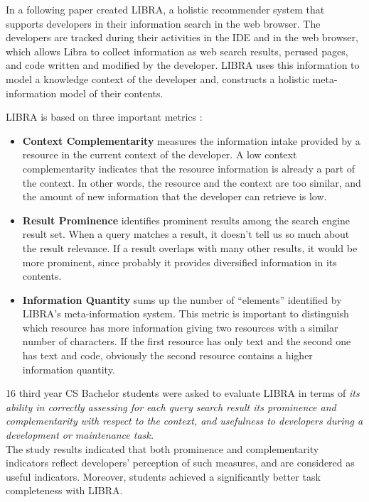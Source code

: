 \documentclass[12pt,mscthesis]{usiinfthesis}
\begin{document}
	
	In a following paper \citet{Ponz2017a} created LIBRA, a holistic recommender system that supports developers in their information search in the web browser. The developers are tracked during their activities in the IDE and in the web browser, which allows Libra to collect information as web search results, perused pages, and code written and modified by the developer. LIBRA uses this information to model a knowledge context of the developer and, constructs a holistic meta-information model of their contents.
	

	LIBRA is based on three important metrics :
	
	\begin{itemize}
	\item \textbf{Context Complementarity} measures the information intake provided by a resource in the current context of the developer. A low context complementarity indicates that the resource information is already a part of the context. In other words, the resource and the context are too similar, and the amount of new information that the developer can retrieve is low.
	
	\item \textbf{Result Prominence} identifies prominent results among the search engine result set. When a query matches a result, it doesn't tell us so much about the result relevance. If a result overlaps with many other results, it would be more prominent, since probably it provides diversified information in its contents.
	
	\item \textbf{Information Quantity} sums up the number of ``elements'' identified by LIBRA's meta-information system. This metric is important to distinguish which resource has more information giving two resources with a similar number of characters. If the first resource has only text and the second one has text and code, obviously the second resource contains a higher information quantity.
	\end{itemize}
	16 third year CS Bachelor students were asked to evaluate LIBRA in terms of \textit{its ability in correctly assessing for each query search result its prominence and complementarity with respect to the context, and usefulness to developers during a development or maintenance task.}\\
	The study results indicated that both prominence and complementarity indicators reflect developers’ perception of such measures, and are considered as useful indicators. Moreover, students  achieved a significantly better task completeness with LIBRA.\\
\end{document}
